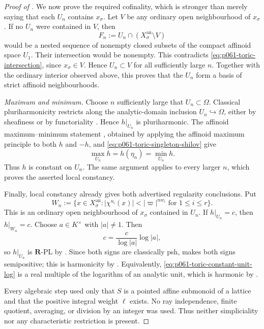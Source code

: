 \begin{proof}[Proof of ]
We now prove the required cofinality, which is stronger than merely saying
that each \(U_n\) contains \(x_{\sigma}\).  Let \(V\) be any ordinary open
neighbourhood of \(x_{\sigma}\).  If no \(U_n\) were contained in \(V\),
then
\[
          F_n:=U_n\cap(X_{\sigma}^{\mathrm{an}}\setminus V)
\]
would be a nested sequence of nonempty closed subsets of the compact
affinoid space \(U_1\).  Their intersection would be nonempty.  This
contradicts \eqref{eq:p061-toric-intersection}, since
\(x_{\sigma}\in V\).  Hence \(U_n\subset V\) for all sufficiently large
\(n\).  Together with the ordinary interior observed above, this proves
that the \(U_n\) form a basis of strict affinoid neighbourhoods.

\smallskip
\noindent
\emph{Maximum and minimum.}
Choose \(n\) sufficiently large that \(U_n\subset\Omega\).  Classical
pluriharmonicity restricts along the analytic-domain inclusion
\(U_n\hookrightarrow\Omega\), either by sheafiness or by functoriality
\cite[Proposition~7.2(1),(7)]{GR25Classical}.  Hence
\(h|_{U_n}\) is pluriharmonic.  The affinoid maximum--minimum statement
\cite[Proposition~7.3]{GR25Classical}, obtained by applying the affinoid
maximum principle \cite[Theorem~6.4]{GR25Classical} to both \(h\) and
\(-h\), and \eqref{eq:p061-toric-singleton-shilov} give
\[
 \max_{U_n}h=h(\eta_n)=\min_{U_n}h.
\]
Thus \(h\) is constant on \(U_n\).  The same argument applies to every
larger \(n\), which proves the asserted local constancy.

Finally, local constancy already gives both advertised regularity
conclusions.  Put
\[
 W_n:=\{x\in X_{\sigma}^{\mathrm{an}}:
           |\chi^{u_i}(x)|<|\varpi|^{nw_i}\text{ for }1\leq i\leq r\}.
\]
This is an ordinary open neighbourhood of \(x_{\sigma}\) contained in
\(U_n\).  If \(h|_{U_n}=c\), then \(h|_{W_n}=c\).  Choose
\(a\in K^{\times}\) with
\(|a|\ne1\).  Then
\begin{equation}
\label{eq:p061-toric-constant-unit-log}
             c=\frac{c}{\log|a|}\log|a|,
\end{equation}
so \(h|_{U_n}\) is \(\mathbf R\)-PL by
\cite[Definition~5.1]{GJR26}.  Since both signs are classically psh,
\cite[Theorem~4.3]{GR25Classical} makes both signs semipositive; this is
harmonicity by \cite[Definition~7.2]{GJR26}.  Equivalently,
\eqref{eq:p061-toric-constant-unit-log} is a real multiple of the
logarithm of an analytic unit, which is harmonic by
\cite[Remark~7.3(5),(6)]{GJR26}.

Every algebraic step used only that \(S\) is a pointed affine submonoid of
a lattice and that the positive integral weight \(\ell\) exists.  No ray
independence, finite quotient, averaging, or division by an integer was
used.  Thus neither simpliciality nor any characteristic restriction is
present.
\end{proof}
